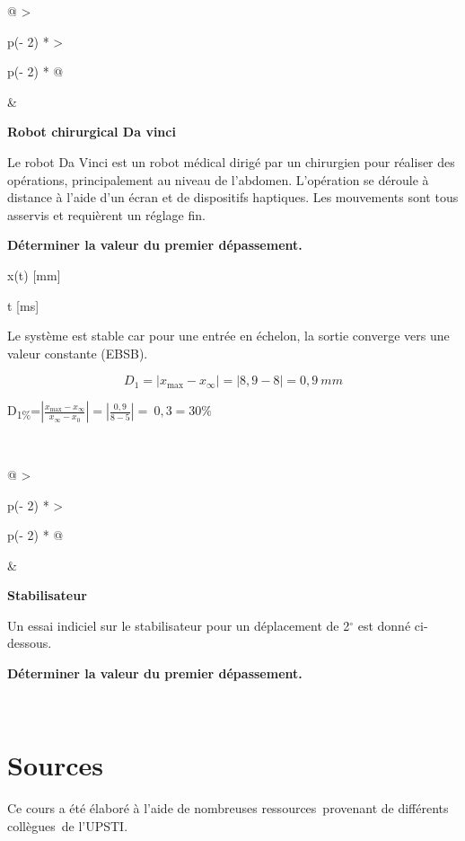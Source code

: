 \begin{longtable}[]{@{}
  >{\raggedright\arraybackslash}p{(\columnwidth - 2\tabcolsep) * }
  >{\raggedright\arraybackslash}p{(\columnwidth - 2\tabcolsep) * }@{}}
\toprule\noalign{}
\begin{minipage}[b]{\linewidth}\raggedright
\begin{quote}
\end{quote}
\end{minipage} & \begin{minipage}[b]{\linewidth}\raggedright
\textbf{Robot chirurgical Da vinci}

Le
robot Da Vinci est un robot médical dirigé par un chirurgien pour
réaliser des opérations, principalement au niveau de l'abdomen.
L'opération se déroule à distance à l'aide d'un écran et de dispositifs
haptiques. Les mouvements sont tous asservis et requièrent un réglage
fin.

\textbf{Déterminer la valeur du premier dépassement.}

x(t) {[}mm{]}


t {[}ms{]}

Le système est stable car pour une entrée en échelon, la sortie converge
vers une valeur constante (EBSB).

\[D_{1} = \left| x_{\max} - x_{\infty} \right| = |8,9 - 8| = 0,9\ mm\]

D\textsubscript{1\%}=\(\left| \frac{x_{\max} - x_{\infty}}{x_{\infty} - x_{0}} \right| = \left| \frac{0,9}{8 - 5} \right| = \ 0,3 = 30\%\)
\end{minipage} \\
\midrule\noalign{}
\endhead
\bottomrule\noalign{}
\endlastfoot
\end{longtable}

\begin{longtable}[]{@{}
  >{\raggedright\arraybackslash}p{(\columnwidth - 2\tabcolsep) * }
  >{\raggedright\arraybackslash}p{(\columnwidth - 2\tabcolsep) * }@{}}
\toprule\noalign{}
\begin{minipage}[b]{\linewidth}\raggedright
\begin{quote}
\end{quote}
\end{minipage} & \begin{minipage}[b]{\linewidth}\raggedright
\textbf{Stabilisateur}

Un essai indiciel sur le stabilisateur pour un déplacement de 2$^\circ$ est
donné ci-dessous.


\textbf{Déterminer la valeur du premier dépassement.}
\end{minipage} \\
\midrule\noalign{}
\endhead
\bottomrule\noalign{}
\endlastfoot
\end{longtable}

\section{Sources}\label{sources}

Ce cours a été élaboré à l'aide de nombreuses ressources~provenant de
différents collègues~de l'UPSTI.
